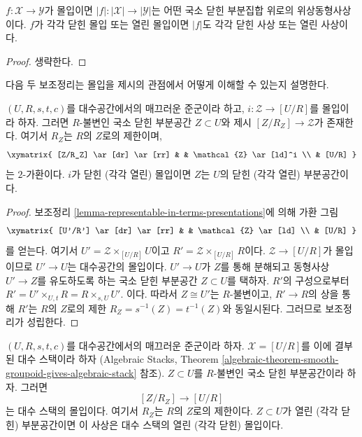 \begin{lemma}
\label{lemma-subspace-induced-topology}
$f : \mathcal{X} \to \mathcal{Y}$가 몰입이면
$|f| : |\mathcal{X}| \to |\mathcal{Y}|$는 어떤 국소 닫힌 부분집합 위로의
위상동형사상이다. $f$가 각각 닫힌 몰입 또는 열린 몰입이면
$|f|$도 각각 닫힌 사상 또는 열린 사상이다.
\end{lemma}

\begin{proof}
생략한다.
\end{proof}

\noindent
다음 두 보조정리는 몰입을 제시의 관점에서 어떻게 이해할 수 있는지 설명한다.

\begin{lemma}
\label{lemma-immersion-into-presentation}
$(U, R, s, t, c)$를 대수공간에서의 매끄러운 준군이라 하고,
$i : \mathcal{Z} \to [U/R]$를 몰입이라 하자.
그러면 $R$-불변인 국소 닫힌 부분공간 $Z \subset U$와
제시 $[Z/R_Z] \to \mathcal{Z}$가 존재한다. 여기서 $R_Z$는
$R$의 $Z$로의 제한이며,
$$
\xymatrix{
[Z/R_Z] \ar[dr] \ar[rr] & & \mathcal{Z} \ar[ld]^i \\
& [U/R]
}
$$
는 $2$-가환이다. $i$가 닫힌 (각각 열린) 몰입이면
$Z$는 $U$의 닫힌 (각각 열린) 부분공간이다.
\end{lemma}

\begin{proof}
보조정리 \ref{lemma-representable-in-terms-presentations}에 의해
가환 그림
$$
\xymatrix{
[U'/R'] \ar[dr] \ar[rr] & & \mathcal{Z} \ar[ld] \\
& [U/R]
}
$$
를 얻는다. 여기서 $U' = \mathcal{Z} \times_{[U/R]} U$이고
$R' = \mathcal{Z} \times_{[U/R]} R$이다.
$\mathcal{Z} \to [U/R]$가 몰입이므로 $U' \to U$는 대수공간의 몰입이다.
$U' \to U$가 $Z$를 통해 분해되고 동형사상 $U' \to Z$를 유도하도록 하는
국소 닫힌 부분공간 $Z \subset U$를 택하자.
$R'$의 구성으로부터
$R' = U' \times_{U, t} R = R \times_{s, U} U'$.
이다. 따라서 $Z \cong U'$는 $R$-불변이고, $R' \to R$의 상을 통해
$R'$는 $R$의 $Z$로의 제한
$R_Z = s^{-1}(Z) = t^{-1}(Z)$와 동일시된다. 그러므로 보조정리가 성립한다.
\end{proof}

\begin{lemma}
\label{lemma-immersion-presentation}
$(U, R, s, t, c)$를 대수공간에서의 매끄러운 준군이라 하자.
$\mathcal{X} = [U/R]$를 이에 결부된 대수 스택이라 하자
(Algebraic Stacks,
Theorem \ref{algebraic-theorem-smooth-groupoid-gives-algebraic-stack} 참조).
$Z \subset U$를 $R$-불변인 국소 닫힌 부분공간이라 하자. 그러면
$$
[Z/R_Z] \longrightarrow [U/R]
$$
는 대수 스택의 몰입이다. 여기서 $R_Z$는 $R$의 $Z$로의 제한이다.
$Z \subset U$가 열린 (각각 닫힌) 부분공간이면 이 사상은
대수 스택의 열린 (각각 닫힌) 몰입이다.
\end{lemma}

